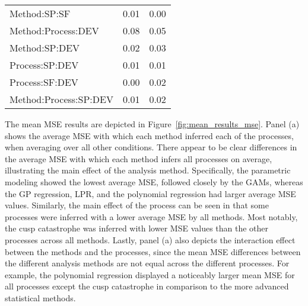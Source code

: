 \documentclass[man, floatsintext]{apa7}
\begin{document}
\begin{table}[tbp]
\begin{center}
\begin{threeparttable}
\begin{tabular}{lll}
        \\
        Method:SP:SF          & 0.01                                     & 0.00
        \\
        Method:Process:DEV    & 0.08                                     & 0.05
        \\
        Method:SP:DEV         & 0.02                                     & 0.03
        \\
        Process:SP:DEV        & 0.01                                     & 0.01
        \\
        Process:SF:DEV        & 0.00                                     & 0.02
        \\
        Method:Process:SP:DEV & 0.01                                     & 0.02
        \\
        \bottomrule
      \end{tabular}
    \end{threeparttable}
  \end{center}
\end{table}

The mean MSE results are depicted in Figure~\ref{fig:mean_results_mse}. Panel
(a) shows the average MSE with which each method inferred each of the
processes, when averaging over all other conditions. There appear to be clear
differences in the average MSE with which each method infers all processes on
average, illustrating the main effect of the analysis method. Specifically, the
parametric modeling showed the lowest average MSE, followed closely by the
GAMs, whereas the GP regression, LPR, and the polynomial regression had larger
average MSE values. Similarly, the main effect of the process can be seen in
that some processes were inferred with a lower average MSE by all methods. Most
notably, the cusp catastrophe was inferred with lower MSE values than the other
processes across all methods. Lastly, panel (a) also depicts the interaction
effect between the methods and the processes, since the mean MSE differences
between the different analysis methods are not equal across the different
processes. For example, the polynomial regression displayed a noticeably larger
mean MSE for all processes except the cusp catastrophe in comparison to the
more advanced statistical methods.
\end{document}
